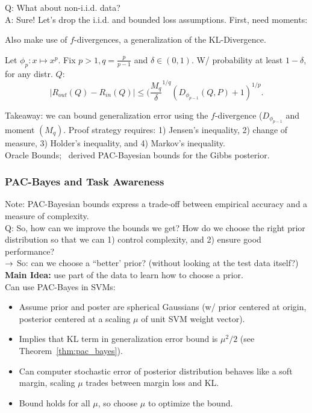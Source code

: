 Q: What about non-i.i.d. data? \\

A: Sure! Let's drop the i.i.d. and bounded loss assumptions. First, need moments:

Also make use of $f$-divergences, a generalization of the KL-Divergence. \\

\begin{theorem}
Let $\phi_p : x \mapsto x^p$. Fix $p > 1, q = \frac{p}{p-1}$ and $\delta \in (0,1)$. W/ probability at least $1-\delta$, for any distr. $Q$:
\[
|R_{out}(Q) - R_{in}(Q)| \leq (\frac{M_q}{\delta}^{1/q}(D_{\phi_{p-1}}(Q,P) + 1)^{1/p}.
\]
\end{theorem}

Takeaway: we can bound generalization error using the $f$-divergence ($D_{\phi_{p-1}}$ and moment $(M_q)$. Proof strategy requires: 1) Jensen's inequality, 2) change of measure, 3) Holder's inequality, and 4) Markov's inequality. \\

Oracle Bounds;~\citet{catoni2007pac} derived PAC-Bayesian bounds for the Gibbs posterior.

\subsubsection{PAC-Bayes and Task Awareness}

Note: PAC-Bayesian bounds express a trade-off between empirical accuracy and a measure of complexity. \\

Q: So, how can we improve the bounds we get? How do we choose the right prior distribution so that we can 1) control complexity, and 2) ensure good performance? \\

$\rightarrow$ So: can we choose a ``better' prior? (without looking at the test data itself?) \\

{\bf Main Idea:} use part of the data to learn how to choose a prior. \\

Can use PAC-Bayes in SVMs:
\begin{itemize}
    \item Assume prior and poster are spherical Gaussians (w/ prior centered at origin, posterior centered at a scaling $\mu$ of unit SVM weight vector).
    \item Implies that KL term in generalization error bound is $\mu^2 / 2$ (see Theorem~\ref{thm:pac_bayes}).
    \item Can computer stochastic error of posterior distribution behaves like a soft margin, scaling $\mu$ trades between margin loss and KL.
    \item Bound holds for all $\mu$, so choose $\mu$ to optimize the bound.
\end{itemize}

